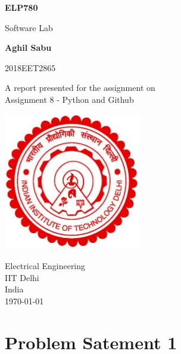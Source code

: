 \documentclass{article}
\begin{document}
    \begin{titlepage}
        \begin{center}
            \vspace*{0cm}
            \Huge
            \textbf{ELP780}
     
            \vspace{0.5cm}
            \LARGE
            Software Lab
     
            \vspace{1.5cm}
            \textbf{Aghil Sabu\\}

            \vspace{.3cm}
            2018EET2865
     
            \vfill
            A report presented for the assignment on\\
            Assignment 8 - Python and Github 
     
            \vspace{0.8cm}
            \includegraphics[width=0.45\textwidth]{./images/logo}
     
            \Large
            Electrical Engineering\\
            IIT Delhi\\
            India\\
            \today
        \end{center}
    \end{titlepage}
    \tableofcontents
    \pagebreak
    
    \section{Problem Satement 1}
\end{document}
